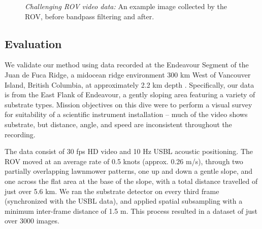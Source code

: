 \begin{figure}
\begin{center}

%
\end{center}

\caption{
    \emph{Challenging ROV video data:}
	\protect{} An example image collected by the ROV, before bandpass filtering and 
	\protect{} after. 
}
\label{fig:rov-eg}
\end{figure}

\subsection{Evaluation}

We validate our method using data recorded at the Endeavour Segment of the Juan de Fuca Ridge, a midocean
ridge environment 300 km West of Vancouver Island, British Columbia, at approximately 2.2 km depth \citep{endeavourMPAPlan}. Specifically, our data is from the East Flank of Endeavour, a gently sloping area featuring a variety of substrate types. Mission objectives on this dive were to perform a visual survey for suitability of a scientific instrument installation -- much of the video shows substrate, but distance, angle, and speed are inconsistent throughout the recording.

The data consist of 30 fps HD video and 10 Hz USBL acoustic positioning. The ROV moved at an average rate of 0.5 knots (approx. 0.26 m/s), through two partially overlapping lawnmower patterns, one up and down a gentle slope, and one across the flat area at the base of the slope, with a total distance travelled of just over 5.6 km. We ran the substrate detector on every third frame (synchronized with the USBL data), and applied spatial subsampling with a minimum inter-frame distance of 1.5 m. This process resulted in a dataset of just over 3000 images.

